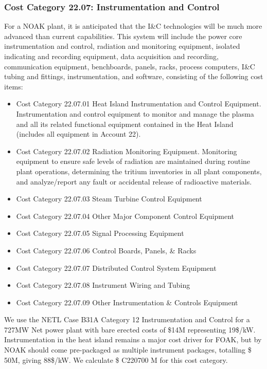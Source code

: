 \subsubsection{Cost Category 22.07: Instrumentation and Control }

For a NOAK plant, it is anticipated that the I\&C technologies will be much more advanced than current  capabilities. This system will include the power core instrumentation and control, radiation and  monitoring equipment, isolated indicating and recording equipment, data acquisition and  recording, communication equipment, benchboards, panels, racks, process computers, I\&C tubing and fittings, instrumentation, and software, consisting of the following cost items:

\begin{itemize}
\item Cost Category 22.07.01 Heat Island Instrumentation and Control Equipment. Instrumentation and control equipment to monitor and manage the plasma and all  its related functional equipment contained in the Heat Island (includes all equipment in Account 22).

\item Cost Category 22.07.02 Radiation Monitoring Equipment. Monitoring equipment to ensure safe levels of radiation are maintained  during routine plant operations, determining the tritium inventories in all plant components, and  analyze/report any fault or accidental release of radioactive materials. 

\item Cost Category 22.07.03 Steam Turbine Control Equipment	

\item Cost Category 22.07.04 Other Major Component Control Equipment	

\item Cost Category 22.07.05 Signal Processing Equipment	

\item Cost Category 22.07.06 Control Boards, Panels, \& Racks	
\item Cost Category 22.07.07 Distributed Control System Equipment	
\item Cost Category 22.07.08 Instrument Wiring and Tubing	
\item Cost Category 22.07.09 Other Instrumentation \& Controls Equipment	


\end{itemize}


We use the NETL Case B31A Category 12 Instrumentation and Control for a 727MW Net power plant with bare erected costs of \$14M representing 19\$/kW.  Instrumentation in the heat island remains a major cost driver for FOAK, but by NOAK should come pre-packaged as multiple instrument packages, totalling \$ 50M, giving 88\$/kW.   We calculate \$ C220700 M for this cost category.